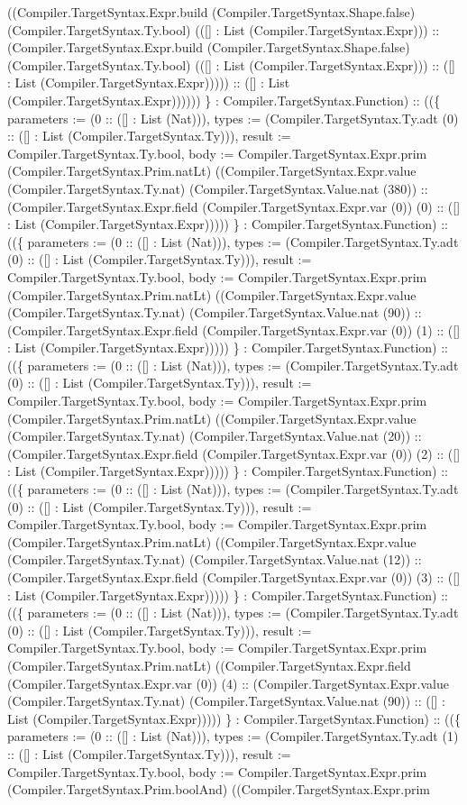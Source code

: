 \documentclass[11pt]{article}
\begin{document}
((Compiler.TargetSyntax.Expr.build (Compiler.TargetSyntax.Shape.false) (Compiler.TargetSyntax.Ty.bool) (([] : List (Compiler.TargetSyntax.Expr))) :: (Compiler.TargetSyntax.Expr.build (Compiler.TargetSyntax.Shape.false) (Compiler.TargetSyntax.Ty.bool) (([] : List (Compiler.TargetSyntax.Expr))) :: ([] : List (Compiler.TargetSyntax.Expr))))) :: ([] : List (Compiler.TargetSyntax.Expr)))))) \} : Compiler.TargetSyntax.Function) :: ((\{ parameters := (0 :: ([] : List (Nat))), types := (Compiler.TargetSyntax.Ty.adt (0) :: ([] : List (Compiler.TargetSyntax.Ty))), result := Compiler.TargetSyntax.Ty.bool, body := Compiler.TargetSyntax.Expr.prim (Compiler.TargetSyntax.Prim.natLt) ((Compiler.TargetSyntax.Expr.value (Compiler.TargetSyntax.Ty.nat) (Compiler.TargetSyntax.Value.nat (380)) :: (Compiler.TargetSyntax.Expr.field (Compiler.TargetSyntax.Expr.var (0)) (0) :: ([] : List (Compiler.TargetSyntax.Expr))))) \} : Compiler.TargetSyntax.Function) :: ((\{ parameters := (0 :: ([] : List (Nat))), types := (Compiler.TargetSyntax.Ty.adt (0) :: ([] : List (Compiler.TargetSyntax.Ty))), result := Compiler.TargetSyntax.Ty.bool, body := Compiler.TargetSyntax.Expr.prim (Compiler.TargetSyntax.Prim.natLt) ((Compiler.TargetSyntax.Expr.value (Compiler.TargetSyntax.Ty.nat) (Compiler.TargetSyntax.Value.nat (90)) :: (Compiler.TargetSyntax.Expr.field (Compiler.TargetSyntax.Expr.var (0)) (1) :: ([] : List (Compiler.TargetSyntax.Expr))))) \} : Compiler.TargetSyntax.Function) :: ((\{ parameters := (0 :: ([] : List (Nat))), types := (Compiler.TargetSyntax.Ty.adt (0) :: ([] : List (Compiler.TargetSyntax.Ty))), result := Compiler.TargetSyntax.Ty.bool, body := Compiler.TargetSyntax.Expr.prim (Compiler.TargetSyntax.Prim.natLt) ((Compiler.TargetSyntax.Expr.value (Compiler.TargetSyntax.Ty.nat) (Compiler.TargetSyntax.Value.nat (20)) :: (Compiler.TargetSyntax.Expr.field (Compiler.TargetSyntax.Expr.var (0)) (2) :: ([] : List (Compiler.TargetSyntax.Expr))))) \} : Compiler.TargetSyntax.Function) :: ((\{ parameters := (0 :: ([] : List (Nat))), types := (Compiler.TargetSyntax.Ty.adt (0) :: ([] : List (Compiler.TargetSyntax.Ty))), result := Compiler.TargetSyntax.Ty.bool, body := Compiler.TargetSyntax.Expr.prim (Compiler.TargetSyntax.Prim.natLt) ((Compiler.TargetSyntax.Expr.value (Compiler.TargetSyntax.Ty.nat) (Compiler.TargetSyntax.Value.nat (12)) :: (Compiler.TargetSyntax.Expr.field (Compiler.TargetSyntax.Expr.var (0)) (3) :: ([] : List (Compiler.TargetSyntax.Expr))))) \} : Compiler.TargetSyntax.Function) :: ((\{ parameters := (0 :: ([] : List (Nat))), types := (Compiler.TargetSyntax.Ty.adt (0) :: ([] : List (Compiler.TargetSyntax.Ty))), result := Compiler.TargetSyntax.Ty.bool, body := Compiler.TargetSyntax.Expr.prim (Compiler.TargetSyntax.Prim.natLt) ((Compiler.TargetSyntax.Expr.field (Compiler.TargetSyntax.Expr.var (0)) (4) :: (Compiler.TargetSyntax.Expr.value (Compiler.TargetSyntax.Ty.nat) (Compiler.TargetSyntax.Value.nat (90)) :: ([] : List (Compiler.TargetSyntax.Expr))))) \} : Compiler.TargetSyntax.Function) :: ((\{ parameters := (0 :: ([] : List (Nat))), types := (Compiler.TargetSyntax.Ty.adt (1) :: ([] : List (Compiler.TargetSyntax.Ty))), result := Compiler.TargetSyntax.Ty.bool, body := Compiler.TargetSyntax.Expr.prim (Compiler.TargetSyntax.Prim.boolAnd) ((Compiler.TargetSyntax.Expr.prim 
\end{document}
